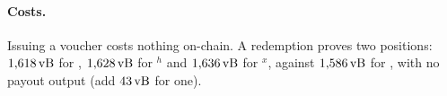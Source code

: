 \algReceive
\algSettle

\paragraph{Costs.} Issuing a voucher costs nothing on-chain. A
redemption proves two positions: $1{,}618\,\mathrm{vB}$ for ,
$1{,}628\,\mathrm{vB}$ for $^{h}$ and $1{,}636\,\mathrm{vB}$ for $^{x}$,
against $1{,}586\,\mathrm{vB}$ for , with no payout output (add $43\,\mathrm{vB}$
for one).
